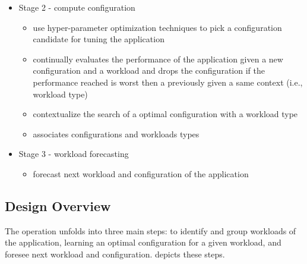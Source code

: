 \begin{itemize}
\begin{itemize}
     \end{itemize}

   \item Stage 2 - compute configuration

      \begin{itemize}

        \item use hyper-parameter optimization techniques to pick a
          configuration candidate for tuning the application

        \item continually evaluates the performance of the application given a
          new configuration and a workload and drops the configuration if the
          performance reached is worst then a previously given a same context
          (i.e., workload type) 

        \item contextualize the search of a optimal configuration with a
          workload type

        \item associates configurations and workloads types

      \end{itemize}

   \item Stage 3 - workload forecasting

      \begin{itemize}

        \item forecast next workload and configuration of the application

      \end{itemize}
 \end{itemize}

\subsection{Design Overview}


The \name operation unfolds into three main steps: to identify and group
workloads of the application, learning an optimal configuration for a given
workload, and foresee next workload and configuration. 
depicts these steps.

